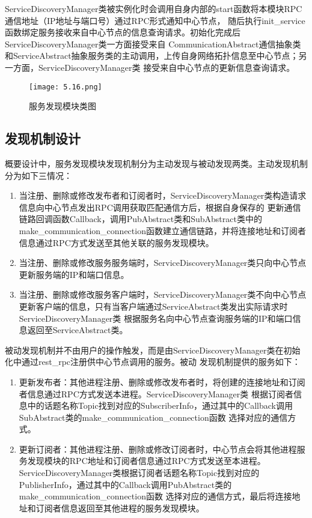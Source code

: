 ServiceDiscoveryManager类被实例化时会调用自身内部的start函数将本模块RPC通信地址（IP地址与端口号）通过RPC形式通知中心节点，
随后执行init\_service函数绑定服务接收来自中心节点的信息查询请求。初始化完成后ServiceDiscoveryManager类一方面接受来自
CommunicationAbstract通信抽象类和ServiceAbstract抽象服务类的主动调用，上传自身网络拓扑信息至中心节点；另一方面，ServiceDiscoveryManager类
接受来自中心节点的更新信息查询请求。

\begin{figure}[htb]
  \centering
  \texttt{[image: 5.16.png]}
  \caption{服务发现模块类图}
  \label{fig:11}
\end{figure}

\subsection{发现机制设计}
概要设计中，服务发现模块发现机制分为主动发现与被动发现两类。主动发现机制分为如下三情况：
\begin{enumerate}
  \item 当注册、删除或修改发布者和订阅者时，ServiceDiscoveryManager类构造请求信息向中心节点发出RPC调用获取匹配通信方后，根据自身保存的
  更新通信链路回调函数Callback，调用PubAbstract类和SubAbstract类中的make\_communication\_connection函数建立通信链路，并将连接地址和订阅者信息通过RPC方式发送至其他关联的服务发现模块。
  \item 当注册、删除或修改服务服务端时，ServiceDiscoveryManager类只向中心节点更新服务端的IP和端口信息。
  \item 当注册、删除或修改服务客户端时，ServiceDiscoveryManager类不向中心节点更新客户端的信息，只有当客户端通过ServiceAbstract类发出实际请求时ServiceDiscoveryManager类
  根据服务名向中心节点查询服务端的IP和端口信息返回至ServiceAbstract类。
\end{enumerate}

被动发现机制并不由用户的操作触发，而是由ServiceDiscoveryManager类在初始化中通过rest\_rpc注册供中心节点调用的服务。被动
发现机制提供的服务如下：
\begin{enumerate}
  \item 更新发布者：其他进程注册、删除或修改发布者时，将创建的连接地址和订阅者信息通过RPC方式发送本进程。ServiceDiscoveryManager类
  根据订阅者信息中的话题名称Topic找到对应的SubscriberInfo，通过其中的Callback调用SubAbstract类的make\_communication\_connection函数
  选择对应的通信方式。
  \item 更新订阅者：其他进程注册、删除或修改订阅者时，中心节点会将其他进程服务发现模块的RPC地址和订阅者信息通过RPC方式发送至本进程。
  ServiceDiscoveryManager类根据订阅者话题名称Topic找到对应的PublisherInfo，通过其中的Callback调用PubAbstract类的make\_communication\_connection函数
  选择对应的通信方式，最后将连接地址和订阅者信息返回至其他进程的服务发现模块。
\end{enumerate}

